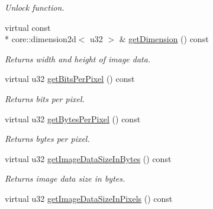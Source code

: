 \begin{DoxyCompactItemize}
\begin{DoxyCompactList}\small\item\em Unlock function. \end{DoxyCompactList}\item 
\hypertarget{classirr_1_1video_1_1_c_image_a399565e9299380cf06510cf2ae96828b}{virtual const \\*
core\-::dimension2d$<$ u32 $>$ \& \hyperlink{classirr_1_1video_1_1_c_image_a399565e9299380cf06510cf2ae96828b}{get\-Dimension} () const }\label{classirr_1_1video_1_1_c_image_a399565e9299380cf06510cf2ae96828b}

\begin{DoxyCompactList}\small\item\em Returns width and height of image data. \end{DoxyCompactList}\item 
\hypertarget{classirr_1_1video_1_1_c_image_a26adf6e55c6c12b583974ca18a20b3b8}{virtual u32 \hyperlink{classirr_1_1video_1_1_c_image_a26adf6e55c6c12b583974ca18a20b3b8}{get\-Bits\-Per\-Pixel} () const }\label{classirr_1_1video_1_1_c_image_a26adf6e55c6c12b583974ca18a20b3b8}

\begin{DoxyCompactList}\small\item\em Returns bits per pixel. \end{DoxyCompactList}\item 
\hypertarget{classirr_1_1video_1_1_c_image_aca953049a05843815d67782186fff67e}{virtual u32 \hyperlink{classirr_1_1video_1_1_c_image_aca953049a05843815d67782186fff67e}{get\-Bytes\-Per\-Pixel} () const }\label{classirr_1_1video_1_1_c_image_aca953049a05843815d67782186fff67e}

\begin{DoxyCompactList}\small\item\em Returns bytes per pixel. \end{DoxyCompactList}\item 
\hypertarget{classirr_1_1video_1_1_c_image_a8ad3323913734f45b78cb3f68a7aa99a}{virtual u32 \hyperlink{classirr_1_1video_1_1_c_image_a8ad3323913734f45b78cb3f68a7aa99a}{get\-Image\-Data\-Size\-In\-Bytes} () const }\label{classirr_1_1video_1_1_c_image_a8ad3323913734f45b78cb3f68a7aa99a}

\begin{DoxyCompactList}\small\item\em Returns image data size in bytes. \end{DoxyCompactList}\item 
\hypertarget{classirr_1_1video_1_1_c_image_a693d76bbbb4669f193e61ee971569877}{virtual u32 \hyperlink{classirr_1_1video_1_1_c_image_a693d76bbbb4669f193e61ee971569877}{get\-Image\-Data\-Size\-In\-Pixels} () const }\label{classirr_1_1video_1_1_c_image_a693d76bbbb4669f193e61ee971569877}


\end{DoxyCompactItemize}
